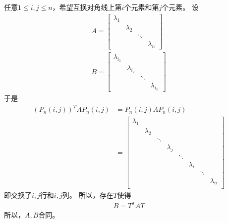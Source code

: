 \documentclass{article}
\begin{document}
任意$1 \leq i, j \leq n$，希望互换对角线上第$i$个元素和第$j$个元素。
设
\begin{align*}
  A = \begin{bmatrix}
        \lambda_1                         \\
         & \lambda_2                      \\
         &           & \ddots             \\
         &           &        & \lambda_n
      \end{bmatrix} \\
  B = \begin{bmatrix}
        \lambda_{i_1}                             \\
         & \lambda_{i_2}                          \\
         &               & \ddots                 \\
         &               &        & \lambda_{i_n}
      \end{bmatrix}
\end{align*}
于是
\begin{align*}
  (P_n(i, j))^T A P_n(i, j)
   & = P_n(i, j) A P_n(i, j)                                                       \\
   & = \begin{bmatrix}
         \lambda_1                                                                   \\
          & \lambda_2                                                                \\
          &           & \ddots                                                       \\
          &           &        & \lambda_j                                           \\
          &           &        &           & \ddots                                  \\
          &           &        &           &        & \lambda_i                      \\
          &           &        &           &        &           & \ddots             \\
          &           &        &           &        &           &        & \lambda_n \\
       \end{bmatrix}
\end{align*}
即交换了$i, j$行和$i, j$列。
所以，存在$T$使得
\begin{align*}
  B = T^T A T
\end{align*}
所以，$A, B$合同。
\end{document}
